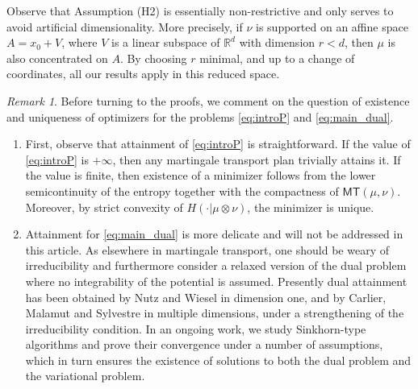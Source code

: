 \documentclass[reqno, a4paper]{amsart}
\theoremstyle{plain}
\theoremstyle{definition}
\theoremstyle{remark}
\newtheorem{remark}[theorem]{Remark}
\numberwithin{equation}{section}
\numberwithin{theorem}{section}
\newcommand{\R}{\mathbb{R}}
\newcommand{\MT}{\mathsf{MT}}
\begin{document}
	Observe that Assumption \textnormal{(H2)} is essentially non-restrictive and only serves to avoid artificial dimensionality. More precisely, if $\nu$ is supported on an affine space $A = x_0 + V$, where $V$ is a linear subspace of $\R^d$ with dimension $r<d$, then $\mu$ is also concentrated on $A$. %
	By choosing $r$ minimal, and up to a change of coordinates, all our results apply in this reduced space.
	
	
	
	
	\begin{remark}
		Before turning to the proofs, we comment on the question of existence and uniqueness of optimizers for the problems \eqref{eq:introP} and \eqref{eq:main_dual}.
		\begin{enumerate}
			\item First, observe that attainment of \eqref{eq:introP} is straightforward. If the value of \eqref{eq:introP} is $+\infty$, then any martingale transport plan trivially attains it. If the value is finite, then existence of a minimizer follows from the lower semicontinuity of the entropy together with the compactness of $\MT(\mu,\nu)$. Moreover, by strict convexity of $H(\cdot |\mu \otimes \nu)$, the minimizer is unique.
			\item Attainment for \eqref{eq:main_dual} is more delicate and will not be addressed in this article. {As elsewhere in martingale transport, one should be weary of irreducibility and furthermore consider a relaxed version of the dual problem where no integrability of the potential is assumed. Presently dual attainment has been obtained by Nutz and Wiesel \cite{NuWi24} in dimension one, and by Carlier, Malamut and Sylvestre \cite{CaMaSy25} in multiple dimensions, under a strengthening of the irreducibility condition}. In an ongoing work, we study Sinkhorn-type algorithms and prove their convergence under a number of assumptions, which in turn ensures the existence of solutions to both the dual problem and the variational problem. 
			

\end{enumerate}
\end{remark}
\end{document}
